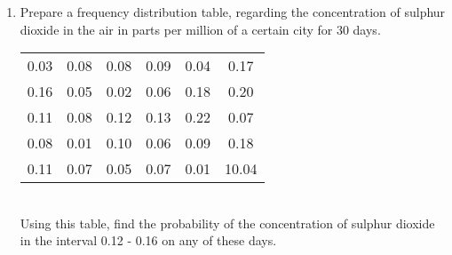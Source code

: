 \renewcommand{\theequation}{\theenumi}
\begin{enumerate}[label=\arabic*.,ref=\thesubsection.\theenumi]
\item Prepare a frequency distribution table, regarding the concentration of sulphur dioxide in the air in parts per million of a certain city for 30 days.\\

\begin{tabular}{ cccccc} 
	
	0.03 &0.08 &0.08 &0.09 &0.04 &0.17 \\
	0.16 &0.05 &0.02 &0.06 &0.18 &0.20 \\
	0.11 &0.08 &0.12 &0.13 &0.22 &0.07  \\
	0.08 &0.01 &0.10 &0.06 &0.09 &0.18 \\ 
	0.11 &0.07 &0.05 &0.07 &0.01 &10.04 \\ 
\end{tabular}\\
Using this table, find the probability of the concentration of sulphur dioxide in the interval 0.12 - 0.16 on any of these days.
\end{enumerate}